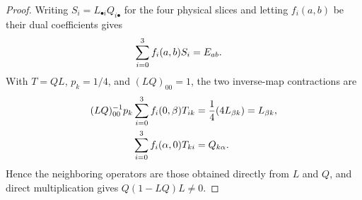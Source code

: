 \begin{proof}
    \leanok
    Writing $S_i=L_{\mathord\bullet i}Q_{i\mathord\bullet}$ for the four physical
    slices and letting $f_i(a,b)$ be their dual coefficients gives
    \begin{align}
        \sum_{i=0}^{3}f_i(a,b)S_i & =E_{ab}. \notag
    \end{align}
    With $T=QL$, $p_k=1/4$, and $(LQ)_{00}=1$, the two inverse-map contractions
    are
    \begin{align}
        (LQ)_{00}^{-1}p_k\sum_{i=0}^{3}f_i(0,\beta)T_{ik}
         & =\frac14(4L_{\beta k})=L_{\beta k}, \notag \\
        \sum_{i=0}^{3}f_i(\alpha,0)T_{ki}
         & =Q_{k\alpha}. \notag
    \end{align}
    Hence the neighboring operators are those obtained directly from $L$ and
    $Q$, and direct multiplication gives $Q(1-LQ)L\ne0$.
\end{proof}


